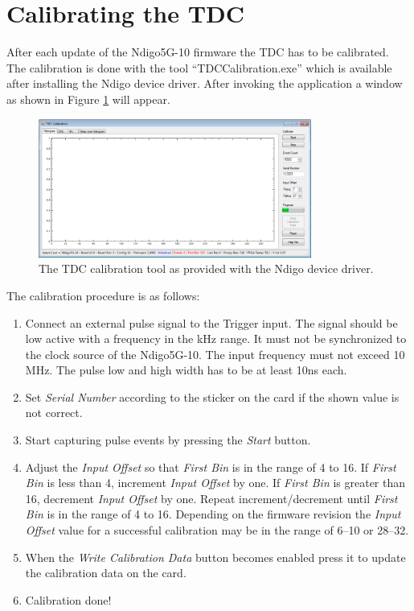     \section{Calibrating the TDC}

        After each update of the Ndigo5G-10 firmware the TDC has to be calibrated. The calibration is done with the tool ``TDC\tu Calibration.exe'' which is available after installing the Ndigo device driver. After invoking the application a window as shown in Figure \ref{fig:Calib} will appear.\par

        \begin{figure}[ht]
            \begin{center}
                \includegraphics[width=0.8\textwidth]{figures/Calib.png}
                \caption{\label{fig:Calib}The TDC calibration tool as provided with the Ndigo device driver.}
            \end{center}
        \end{figure}

        The calibration procedure is as follows:

        \begin{enumerate}
            \item Connect an external pulse signal to the Trigger input. The signal should be low active with a frequency in the kHz range. It must not be synchronized to the clock source of the Ndigo5G-10. The input frequency must not exceed 10 MHz. The pulse low and high width has to be at least 10ns each.
            \item Set \textit{Serial Number} according to the sticker on the card if the shown value is not correct.
            \item Start capturing pulse events by pressing the \textit{Start} button.
            \item Adjust the \textit{Input Offset} so that \textit{First Bin} is in the range of 4 to 16. If \textit{First Bin} is less than 4, increment \textit{Input Offset} by one. If \textit{First Bin} is greater than 16, decrement \textit{Input Offset} by one. Repeat increment/decrement until \textit{First Bin} is in the range of 4 to 16. Depending on the firmware revision the \textit{Input Offset} value for a successful calibration may be in the range of 6–10 or 28–32.
            \item When the \textit{Write Calibration Data} button becomes enabled press it to update the calibration data on the card.
            \item Calibration done!
        \end{enumerate}


